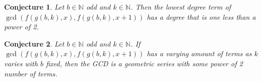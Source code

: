 \documentclass{article}
\newtheorem{conjecture}{Conjecture}
\newcommand{\N}{\mathbb{N}}
\begin{document}
	\begin{conjecture}
		Let $b \in \N$ odd and $k \in \N$. 
		Then the lowest degree term of $\gcd\left(f(g(b,k),x),f(g(b,k),x+1)\right)$ has a degree that is one less than a power of 2.
	\end{conjecture}

	\begin{conjecture}
		Let $b \in \N$ odd and $k \in \N$.
		If $\gcd\left(f(g(b,k),x),f(g(b,k),x+1)\right)$ has a varying amount of terms as $k$ varies with $b$ fixed, then the GCD is a geometric series with some power of 2 number of terms.
	\end{conjecture}
\end{document}
